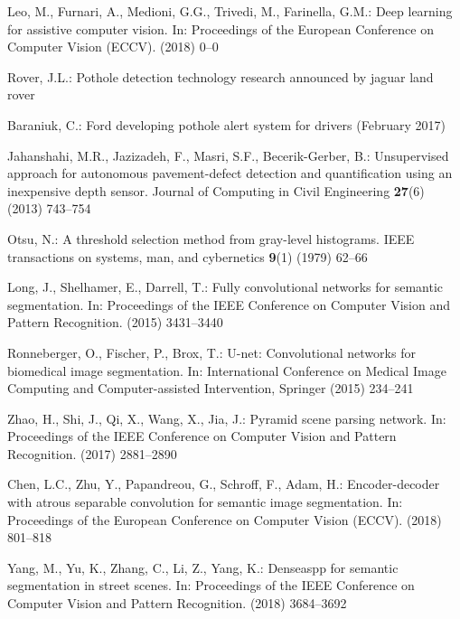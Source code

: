 \documentclass[runningheads]{llncs}
\begin{document}
\begin{thebibliography}{10}
	Leo, M., Furnari, A., Medioni, G.G., Trivedi, M., Farinella, G.M.:
	\newblock Deep learning for assistive computer vision.
	\newblock In: Proceedings of the European Conference on Computer Vision (ECCV).
	(2018)  0--0
	
	Rover, J.L.:
	\newblock Pothole detection technology research announced by jaguar land rover
	
	Baraniuk, C.:
	\newblock Ford developing pothole alert system for drivers (February 2017)
	
	Jahanshahi, M.R., Jazizadeh, F., Masri, S.F., Becerik-Gerber, B.:
	\newblock Unsupervised approach for autonomous pavement-defect detection and
	quantification using an inexpensive depth sensor.
	\newblock Journal of Computing in Civil Engineering \textbf{27}(6) (2013)
	743--754
	
	Otsu, N.:
	\newblock A threshold selection method from gray-level histograms.
	\newblock IEEE transactions on systems, man, and cybernetics \textbf{9}(1)
	(1979)  62--66
	
	Long, J., Shelhamer, E., Darrell, T.:
	\newblock Fully convolutional networks for semantic segmentation.
	\newblock In: Proceedings of the IEEE Conference on Computer Vision and Pattern
	Recognition. (2015)  3431--3440
	
	Ronneberger, O., Fischer, P., Brox, T.:
	\newblock U-net: Convolutional networks for biomedical image segmentation.
	\newblock In: International Conference on Medical Image Computing and
	Computer-assisted Intervention, Springer (2015)  234--241
	
	Zhao, H., Shi, J., Qi, X., Wang, X., Jia, J.:
	\newblock Pyramid scene parsing network.
	\newblock In: Proceedings of the IEEE Conference on Computer Vision and Pattern
	Recognition. (2017)  2881--2890
	
	Chen, L.C., Zhu, Y., Papandreou, G., Schroff, F., Adam, H.:
	\newblock Encoder-decoder with atrous separable convolution for semantic image
	segmentation.
	\newblock In: Proceedings of the European Conference on Computer Vision (ECCV).
	(2018)  801--818
	
	Yang, M., Yu, K., Zhang, C., Li, Z., Yang, K.:
	\newblock Denseaspp for semantic segmentation in street scenes.
	\newblock In: Proceedings of the IEEE Conference on Computer Vision and Pattern
	Recognition. (2018)  3684--3692
	

\end{thebibliography}
\end{document}
